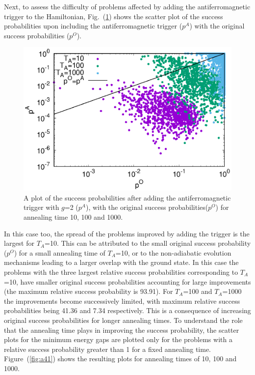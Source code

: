 \documentclass[../main.tex]{subfiles}
\begin{document}
Next, to assess the difficulty of problems affected by adding the antiferromagnetic trigger to the Hamiltonian, Fig.~(\ref{fig:a40}) shows the scatter plot of the success probabilities upon including the antiferromagnetic trigger ($p^A$) with the original success probabilities ($p^O$). 


\begin{figure}
\centering 
\includegraphics[scale=0.8]{ProbScat_g2.eps}
\caption{A plot of the success probabilities after adding the antiferromagnetic trigger with $g$=2 ($p^A$), with the original success probabilities($p^O$) for annealing time 10, 100 and 1000.}
\label{fig:a40}
\end{figure}
In this case too, the spread of the problems improved by adding the trigger is the largest for $T_A$=10. This can be attributed to the small original success probability ($p^O$) for a small annealing time of $T_A$=10, or to the non-adiabatic evolution mechanisms leading to a larger overlap with the ground state. In this case the problems with the three largest relative success probabilities corresponding to $T_A$=10, have smaller original success probabilities accounting for large improvements (the maximum relative success probability is 93.91). For $T_A$=100 and $T_A$=1000 the improvements become successively limited, with maximum relative success probabilities being 41.36 and 7.34 respectively. This is a consequence of increasing original success probabilities for longer annealing times. To understand the role that the annealing time plays in improving the success probability, the scatter plots for the minimum energy gaps are plotted only for the problems with a relative success probability greater than 1 for a fixed annealing time. Figure~(\ref{fig:a41}) shows the resulting plots for annealing times of 10, 100 and 1000.\\
\end{document}

